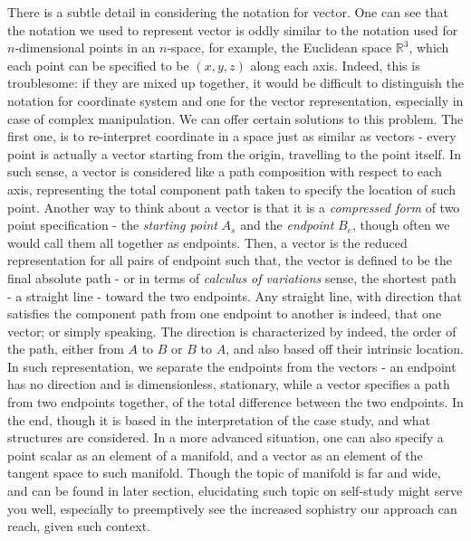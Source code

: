 There is a subtle detail in considering the notation for vector. One can see that the notation we used to represent vector is oddly similar to the notation used for $n$-dimensional points in an $n$-space, for example, the Euclidean space $\mathbb{R}^{3}$, which each point can be specified to be $(x,y,z)$ along each axis. Indeed, this is troublesome: if they are mixed up together, it would be difficult to distinguish the notation for coordinate system and one for the vector representation, especially in case of complex manipulation. We can offer certain solutions to this problem. The first one, is to re-interpret coordinate in a space just as similar as vectors - every point is actually a vector starting from the origin, travelling to the point itself. In such sense, a vector is considered like a path composition with respect to each axis, representing the total component path taken to specify the location of such point. Another way to think about a vector is that it is a \textit{compressed form} of two point specification - the \textit{starting point} $A_{s}$ and the \textit{endpoint} $B_{e}$, though often we would call them all together as endpoints. Then, a vector is the reduced representation for all pairs of endpoint such that, the vector is defined to be the final absolute path - or in terms of \textit{calculus of variations} sense, the shortest path - a straight line - toward the two endpoints. Any straight line, with direction that satisfies the component path from one endpoint to another is indeed, that one vector; or simply speaking. The direction is characterized by indeed, the order of the path, either from $A$ to $B$ or $B$ to $A$, and also based off their intrinsic location. In such representation, we separate the endpoints from the vectors - an endpoint has no direction and is dimensionless, stationary, while a vector specifies a path from two endpoints together, of the total difference between the two endpoints. In the end, though it is based in the interpretation of the case study, and what structures are considered. In a more advanced situation, one can also specify a point scalar as an element of a manifold, and a vector as an element of the tangent space to such manifold. Though the topic of manifold is far and wide, and can be found in later section, elucidating such topic on self-study might serve you well, especially to preemptively see the increased sophistry our approach can reach, given such context. 

